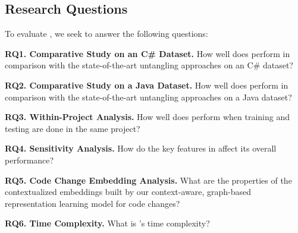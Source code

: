 \subsection{Research Questions}

To evaluate {\tool}, we seek to answer the following questions:

\noindent\textbf{RQ1. Comparative Study on an C\# Dataset.}  How well
does {\tool} perform in comparison with the state-of-the-art
untangling approaches on an C\# dataset?

\noindent\textbf{RQ2. Comparative Study on a Java Dataset.}  How well
does {\tool} perform in comparison with the state-of-the-art
untangling approaches on a Java dataset?

\noindent\textbf{RQ3. Within-Project Analysis.}  How well does {\tool}
perform when training and testing are done in the same project?


\noindent\textbf{RQ4. Sensitivity Analysis.} How do the key features
in {\tool} affect its overall performance?

\noindent\textbf{RQ5. Code Change Embedding Analysis.} What are the
properties of the contextualized embeddings built by our
context-aware, graph-based representation learning model for code
changes?

\noindent\textbf{RQ6. Time Complexity.} What is {\tool}'s time
complexity?
